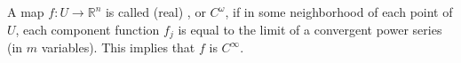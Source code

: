 A map $f: U \to \mathbb{R}^n$ is called (real) , or $C^{\omega}$, if in some neighborhood of each point of $U$, each component function $f_j$ is equal to the limit of a convergent power series (in $m$ variables). This implies that $f$ is $C^{\infty}$.

